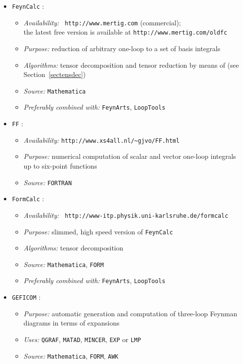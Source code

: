 \begin{itemize}

\item {\tt FeynCalc} \cite{FeynCalc}:
  \begin{itemize}
  \item{\it Availability:} {\tt
      http://www.mertig.com} (commercial);\\ the latest free version is
      available at {\tt http://www.mertig.com/oldfc}
  \item{\it Purpose:} reduction of arbitrary one-loop to a set of basis
    integrals
  \item{\it Algorithms:} tensor decomposition and tensor reduction by
    means of \cite{PasVel79} (see Section~\ref{sectensdec})
  \item{\it Source:} {\tt Mathematica}
  \item{\it Preferably combined with:} {\tt FeynArts}, {\tt LoopTools}
  \end{itemize}


\item {\tt FF} \cite{OldVer89,ffmanual}:
  \begin{itemize}
  \item{\it Availability:} {\tt http://www.xs4all.nl/\~\/gjvo/FF.html}
  \item{\it Purpose:} numerical computation of scalar and vector one-loop
    integrals up to six-point functions
  \item{\it Source:} {\tt FORTRAN}
  \end{itemize}


\item {\tt FormCalc} \cite{FormCalc}:
  \begin{itemize}
  \item{\it Availability:} {\tt
      http://www-itp.physik.uni-karlsruhe.de/formcalc}
  \item{\it Purpose:} slimmed, high speed version of {\tt FeynCalc}
  \item{\it Algorithms:} tensor decomposition
  \item{\it Source:} {\tt Mathematica}, {\tt FORM}
  \item{\it Preferably combined with:} {\tt FeynArts}, {\tt LoopTools} 
  \end{itemize}


\item {\tt GEFICOM} \cite{geficom}:
  \begin{itemize}
  \item{\it Purpose:} automatic generation and computation of three-loop
    Feynman diagrams in terms of expansions
  \item {\it Uses:} {\tt QGRAF}, {\tt MATAD}, {\tt MINCER},
    {\tt EXP} or {\tt LMP}
  \item {\it Source:} {\tt Mathematica}, {\tt FORM}, {\tt AWK}
  \end{itemize}


\end{itemize}
